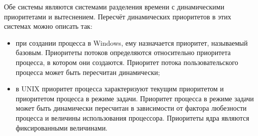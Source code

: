 Обе системы являются системами разделения времени с динамическими приоритетами и вытеснением. Пересчёт динамических приоритетов в этих системах можно описать так:

\begin{itemize}
	\item при создании процесса в Windows, ему назначается приоритет, называемый базовым. Приоритеты потоков определяются относительно приоритета процесса, в котором они создаются. Приоритет потока пользовательского процесса может быть пересчитан динамически;
	\item в UNIX приоритет процесса характеризуют текущим приоритетом и приоритетом процесса в режиме задачи. Приоритет процесса в режиме задачи может быть динамически пересчитан в зависимости от фактора любезности процесса и величины использования процессора. Приоритеты ядра являются фиксированными величинами.
\end{itemize}